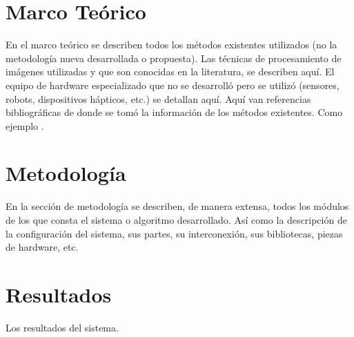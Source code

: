 \documentclass[letterpaper, 11pt]{article}
\begin{document}
%
\section{Marco Teórico}
\label{sec:marcteo}

En el marco teórico se describen todos los métodos existentes utilizados (no la metodología nueva desarrollada o propuesta). Las técnicas de procesamiento de imágenes utilizadas y que son conocidas en la literatura, se describen aquí. El equipo de hardware especializado que no se desarrolló pero se utilizó (sensores, robots, dispositivos hápticos, etc.) se detallan aquí.
Aquí van referencias bibliográficas de donde se tomó la información de los métodos existentes. Como ejemplo \cite{RedBook}.



%
\section{Metodología}
\label{metod}

En la sección de metodología se describen, de manera extensa, todos los módulos de los que consta el sistema o algoritmo desarrollado. Así como la descripción de la configuración del sistema, sus partes, su interconexión, sus bibliotecas, piezas de hardware, etc.





%
\section{Resultados}
\label{res}
Los resultados del sistema.
\end{document}
